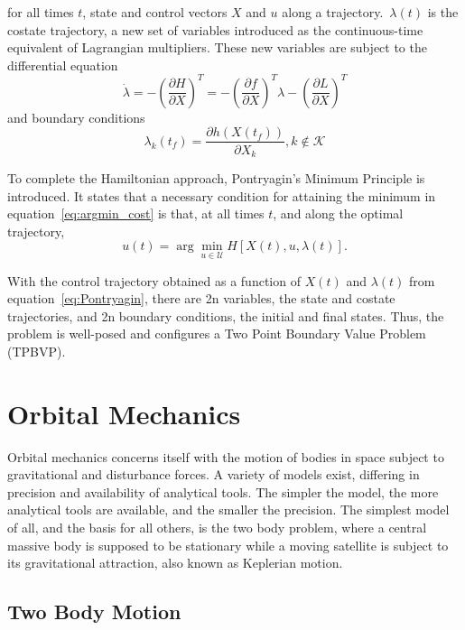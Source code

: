 for all times \(t\), state and control vectors \(X  \) and \(u\) along a trajectory.\ \( \lambda(t) \) is the costate trajectory, a new set of variables introduced as the continuous-time equivalent of Lagrangian multipliers. These new variables are subject to the differential equation
\begin{equation}
    \dot \lambda = - \left( \frac{\partial H}{\partial X} \right)^T = -\left( \frac{\partial f}{\partial X} \right)^T \lambda - \left( \frac{\partial L}{\partial X} \right)^T
\end{equation}
and boundary conditions
\begin{equation}
    \lambda_k(t_f) = \frac{\partial h(X(t_f))}{\partial X_k}, k \notin \mathcal{K}
\end{equation}

To complete the Hamiltonian approach, Pontryagin's Minimum Principle is introduced. It states that a necessary condition for attaining the minimum in equation~\eqref{eq:argmin_cost} is that, at all times \(t\), and along the optimal trajectory,
\begin{equation} \label{eq:Pontryagin}
    u(t) = \arg \min_{u \in \mathcal{U}} H[X(t), u, \lambda(t)].
\end{equation}

With the control trajectory obtained as a function of \(X(t)\) and \(\lambda(t)\) from equation~\eqref{eq:Pontryagin}, there are 2n variables, the state and costate trajectories, and 2n boundary conditions, the initial and final states. Thus, the problem is well-posed and configures a Two Point Boundary Value Problem (TPBVP).

\section{Orbital Mechanics}

Orbital mechanics concerns itself with the motion of bodies in space subject to gravitational and disturbance forces. A variety of models exist, differing in precision and availability of analytical tools. The simpler the model, the more analytical tools are available, and the smaller the precision. The simplest model of all, and the basis for all others, is the two body problem, where a central massive body is supposed to be stationary while a moving satellite is subject to its gravitational attraction, also known as Keplerian motion. 

\subsection{Two Body Motion}

